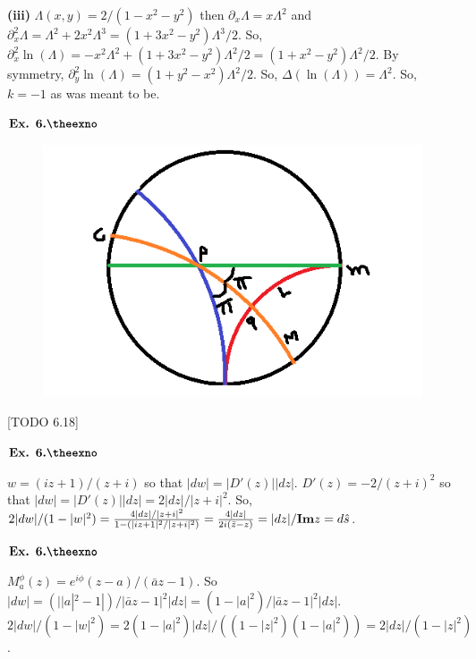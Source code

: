 \documentclass{article}
\def\tf{\textbf}
\def\mf{\ensuremath\mathbf}
\newcounter{exno}
\begin{document}
\tf{(iii)} $\Lambda(x,y)=2/(1-x^2-y^2)$ then $\partial_{x}\Lambda =x \Lambda^2$ and $\partial_x^2 \Lambda = \Lambda^2 +2x^2\Lambda^3 = (1+3x^2-y^2)\Lambda^3/2$. So, $\partial_{x}^{2}\ln(\Lambda) = -x^2\Lambda^2 + (1+3x^2-y^2)\Lambda^2/2 = (1+x^2-y^2)\Lambda^2/2$. By symmetry, $\partial_{y}^{2}\ln(\Lambda) = (1+y^2-x^2)\Lambda^2/2$. So, $\Delta(\ln(\Lambda)) = \Lambda^2$. So, $k = -1$ as was meant to be.

\vspace{0.2in}

${\textbf{Ex. 6.\theexno}}$
\addtocounter{exno}{1}

\begin{figure}[h!]
    \centering
    \includegraphics[scale=0.7]{6_18}
    \label{6_18}
\end{figure}

[TODO 6.18]

\vspace{0.2in}

${\textbf{Ex. 6.\theexno}}$
\addtocounter{exno}{1}

$w = (iz+1)/(z+i)$ so that $|dw| = |D'(z)||dz|$. $D'(z) = -2/(z+i)^2$ so that $|dw| = |D'(z)||dz| = 2|dz|/|z+i|^2$. So, $2|dw|/(1-|w|^2) = \frac{4|dz|/|z+i|^2}{1-(|iz+1|^2/|z+i|^2)} = \frac{4|dz|}{2i(\bar{z}-z)} = |dz|/\mf{Im}z = d\hat{s}$.

\vspace{0.2in}

${\textbf{Ex. 6.\theexno}}$
\addtocounter{exno}{1}

$M_a^{\phi}(z) = e^{i\phi}(z-a)/(\bar{a}z-1)$. So $|dw| = (||a|^2-1|)/|\bar{a}z-1|^2|dz| = (1-|a|^2)/|\bar{a}z-1|^2|dz|$. $2|dw|/(1-|w|^2) = 2(1-|a|^2)|dz|/((1-|z|^2)(1-|a|^2)) = 2|dz|/(1-|z|^2)$.
\end{document}
